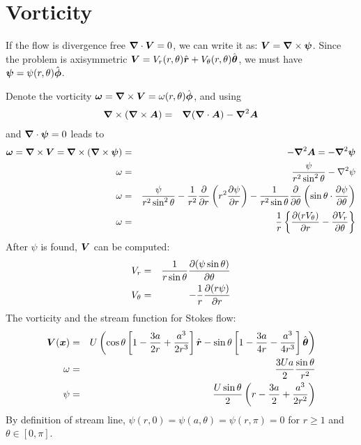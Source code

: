\documentclass[11pt]{article}
\begin{document}
\section{Vorticity}
If the flow is divergence free $\boldsymbol{\nabla} \cdot \boldsymbol{V} = 0$,
we can write it as: $\boldsymbol{V} = \boldsymbol{\nabla} \times \boldsymbol{\psi}$.
Since the problem is axisymmetric
$\boldsymbol{V} = V_r(r,\theta)\hat{\boldsymbol{r}} + V_\theta(r,\theta)\hat{\boldsymbol{\theta}}$,
we must have $\boldsymbol{\psi} = \psi(r,\theta) \hat{\boldsymbol{\phi}}$.

Denote the vorticity $\boldsymbol{\omega} = \boldsymbol{\nabla} \times \boldsymbol{V} =
\omega(r, \theta) \hat{\boldsymbol{\phi}}$,
and using
\begin{eqnarray}
  \boldsymbol{\nabla} \times (\boldsymbol{\nabla} \times \boldsymbol{A}) &=&
  \boldsymbol{\nabla} (\boldsymbol{\nabla} \cdot \boldsymbol{A}) - \boldsymbol{\nabla}^2 \boldsymbol{A}
\end{eqnarray}
and $\boldsymbol{\nabla} \cdot \boldsymbol{\psi} = 0$ leads to
\begin{eqnarray}
  \boldsymbol{\omega} = \boldsymbol{\nabla} \times \boldsymbol{V} = \boldsymbol{\nabla} \times (\boldsymbol{\nabla} \times \boldsymbol{\psi}) &=& - \boldsymbol{\nabla}^2 \boldsymbol{A} = - \boldsymbol{\nabla}^2 \boldsymbol{\psi} \\
  \omega &=& \frac{\psi}{r^2 \sin^2\theta} - \nabla^2 \psi \\
  \omega &=& \frac{\psi}{r^2 \sin^2\theta} - \frac{1}{r^2}\frac{\partial }{\partial r} \left( r^2 \frac{\partial \psi}{\partial r} \right) - \frac{1}{r^2 \sin\theta} \frac{\partial }{\partial \theta}\left( \sin\theta \cdot \frac{\partial \psi}{\partial \theta}\right) \\
  \omega &=& \frac{1}{r}\left\{\frac{\partial (r V_\theta)}{\partial r} - \frac{\partial V_r}{\partial \theta}\right\}
\end{eqnarray}
After $\psi$ is found, $\boldsymbol{V}$ can be computed:
\begin{eqnarray}
  V_r &=& \frac{1}{r \sin\theta}\frac{\partial (\psi \sin\theta)}{\partial \theta} \\
  V_\theta &=& -\frac{1}{r}\frac{\partial (r \psi)}{\partial r}
\end{eqnarray}
The vorticity and the stream function for Stokes flow:
\begin{eqnarray}
\boldsymbol{V}(\boldsymbol{x}) &=& U \left(
\cos\theta \left[1 - \frac{3a}{2r} + \frac{a^3}{2r^3}\right] \hat{\boldsymbol{r}} -
\sin\theta \left[1 - \frac{3a}{4r} - \frac{a^3}{4r^3}\right] \hat{\boldsymbol{\theta}}
\right) \\
\omega &=& \frac{3 U a}{2} \frac{\sin\theta}{r^2} \\
\psi &=& \frac{U \sin\theta}{2} \left( r - \frac{3a}{2} + \frac{a^3}{2r^2} \right)
\end{eqnarray}
By definition of stream line,
$\psi(r, 0) = \psi(a, \theta) = \psi(r, \pi) = 0$
for $r \ge 1$ and $\theta \in [0, \pi]$.
\end{document}

